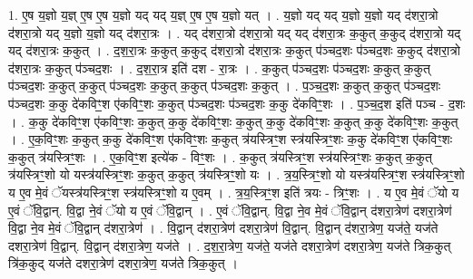 \documentclass[17pt]{extarticle}
\begin{document}
1. ए॒ष य॒ज्ञो य॒ज्ञ् ए॒ष ए॒ष य॒ज्ञो यद् यद् य॒ज्ञ् ए॒ष ए॒ष य॒ज्ञो यत् । . य॒ज्ञो यद् यद् य॒ज्ञो य॒ज्ञो यद् द॑शरा॒त्रो द॑शरा॒त्रो यद् य॒ज्ञो य॒ज्ञो यद् द॑शरा॒त्रः । . यद् द॑शरा॒त्रो द॑शरा॒त्रो यद् यद् द॑शरा॒त्रः क॒कुत् क॒कुद् द॑शरा॒त्रो यद् यद् द॑शरा॒त्रः क॒कुत् । . द॒श॒रा॒त्रः क॒कुत् क॒कुद् द॑शरा॒त्रो द॑शरा॒त्रः क॒कुत् प॑ञ्चद॒शः प॑ञ्चद॒शः क॒कुद् द॑शरा॒त्रो द॑शरा॒त्रः क॒कुत् प॑ञ्चद॒शः । . द॒श॒रा॒त्र इति॑ दश - रा॒त्रः । . क॒कुत् प॑ञ्चद॒शः प॑ञ्चद॒शः क॒कुत् क॒कुत् प॑ञ्चद॒शः क॒कुत् क॒कुत् प॑ञ्चद॒शः क॒कुत् क॒कुत् प॑ञ्चद॒शः क॒कुत् । . प॒ञ्च॒द॒शः क॒कुत् क॒कुत् प॑ञ्चद॒शः प॑ञ्चद॒शः क॒कु दे॑कविꣳ॒॒श ए॑कविꣳ॒॒शः क॒कुत् प॑ञ्चद॒शः प॑ञ्चद॒शः क॒कु दे॑कविꣳ॒॒शः । . प॒ञ्च॒द॒श इति॑ पञ्च - द॒शः । . क॒कु दे॑कविꣳ॒॒श ए॑कविꣳ॒॒शः क॒कुत् क॒कु दे॑कविꣳ॒॒शः क॒कुत् क॒कु दे॑कविꣳ॒॒शः क॒कुत् क॒कु दे॑कविꣳ॒॒शः क॒कुत् । . ए॒क॒विꣳ॒॒शः क॒कुत् क॒कु दे॑कविꣳ॒॒श ए॑कविꣳ॒॒शः क॒कुत् त्र॑यस्त्रिꣳ॒॒श स्त्र॑यस्त्रिꣳ॒॒शः क॒कु दे॑कविꣳ॒॒श ए॑कविꣳ॒॒शः क॒कुत् त्र॑यस्त्रिꣳ॒॒शः । . ए॒क॒विꣳ॒॒श इत्ये॑क - विꣳ॒॒शः । . क॒कुत् त्र॑यस्त्रिꣳ॒॒श स्त्र॑यस्त्रिꣳ॒॒शः क॒कुत् क॒कुत् त्र॑यस्त्रिꣳ॒॒शो यो यस्त्र॑यस्त्रिꣳ॒॒शः क॒कुत् क॒कुत् त्र॑यस्त्रिꣳ॒॒शो यः । . त्र॒य॒स्त्रिꣳ॒॒शो यो यस्त्र॑यस्त्रिꣳ॒॒श स्त्र॑यस्त्रिꣳ॒॒शो य ए॒व मे॒वं ॅयस्त्र॑यस्त्रिꣳ॒॒श स्त्र॑यस्त्रिꣳ॒॒शो य ए॒वम् । . त्र॒य॒स्त्रिꣳ॒॒श इति॑ त्रयः - त्रिꣳ॒॒शः । . य ए॒व मे॒वं ॅयो य ए॒वं ॅवि॒द्वान्. वि॒द्वा ने॒वं ॅयो य ए॒वं ॅवि॒द्वान् । . ए॒वं ॅवि॒द्वान्. वि॒द्वा ने॒व मे॒वं ॅवि॒द्वान् द॑शरा॒त्रेण॑ दशरा॒त्रेण॑ वि॒द्वा ने॒व मे॒वं ॅवि॒द्वान् द॑शरा॒त्रेण॑ । . वि॒द्वान् द॑शरा॒त्रेण॑ दशरा॒त्रेण॑ वि॒द्वान्. वि॒द्वान् द॑शरा॒त्रेण॒ यज॑ते॒ यज॑ते दशरा॒त्रेण॑ वि॒द्वान्. वि॒द्वान् द॑शरा॒त्रेण॒ यज॑ते । . द॒श॒रा॒त्रेण॒ यज॑ते॒ यज॑ते दशरा॒त्रेण॑ दशरा॒त्रेण॒ यज॑ते त्रिक॒कुत् त्रि॑क॒कुद् यज॑ते दशरा॒त्रेण॑ दशरा॒त्रेण॒ यज॑ते त्रिक॒कुत् । \newline
\end{document}
